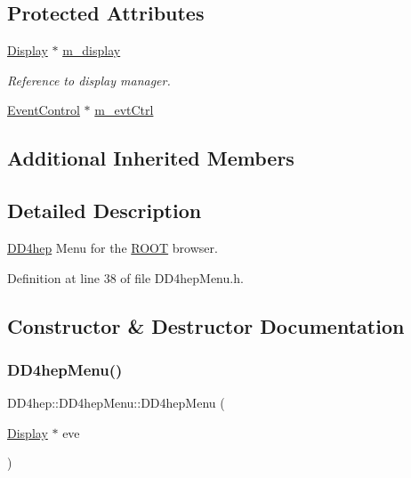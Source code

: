 \subsection*{Protected Attributes}
\begin{DoxyCompactItemize}
\item 
\hyperlink{class_d_d4hep_1_1_display}{Display} $\ast$ \hyperlink{class_d_d4hep_1_1_d_d4hep_menu_a684595fdba5b0f4fb8421ee39f75ad68}{m\+\_\+display}
\begin{DoxyCompactList}\small\item\em Reference to display manager. \end{DoxyCompactList}\item 
\hyperlink{class_d_d4hep_1_1_event_control}{Event\+Control} $\ast$ \hyperlink{class_d_d4hep_1_1_d_d4hep_menu_a3c5139077c3f664d0ab0bcde163466f6}{m\+\_\+evt\+Ctrl}
\end{DoxyCompactItemize}
\subsection*{Additional Inherited Members}


\subsection{Detailed Description}
\hyperlink{namespace_d_d4hep}{D\+D4hep} Menu for the \hyperlink{namespace_r_o_o_t}{R\+O\+OT} browser. 

Definition at line 38 of file D\+D4hep\+Menu.\+h.



\subsection{Constructor \& Destructor Documentation}
\hypertarget{class_d_d4hep_1_1_d_d4hep_menu_a3d62c983630ad5f2d7f31fbe8c3d3e3e}{}\label{class_d_d4hep_1_1_d_d4hep_menu_a3d62c983630ad5f2d7f31fbe8c3d3e3e} 
\subsubsection{\texorpdfstring{D\+D4hep\+Menu()}{DD4hepMenu()}}
{\footnotesize\ttfamily D\+D4hep\+::\+D\+D4hep\+Menu\+::\+D\+D4hep\+Menu (\begin{DoxyParamCaption}\item[{\hyperlink{class_d_d4hep_1_1_display}{Display} $\ast$}]{eve }\end{DoxyParamCaption})}



